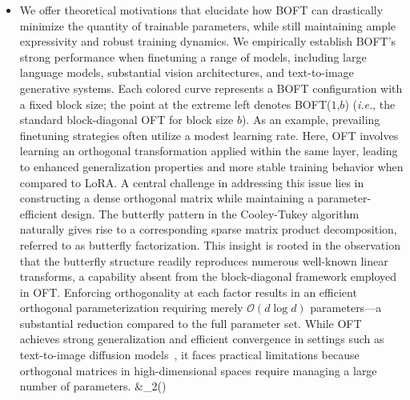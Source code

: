\begin{itemize}[leftmargin=*,nosep]
($m$); for example, BOFT($6$,$4$) requires far fewer parameters but yields an approximation error comparable to BOFT($2$,$16$). To preserve the orthogonality constraint on $\bm{R}$ during fine-tuning, we adopt Cayley parameterization, following~\cite{qiu2023controlling,liu2021orthogonal}: $\bm{R}=(\bm{I}+\bm{Q})(\bm{I}-\bm{Q})^{-1}$, where $\bm{Q}$ is a skew-symmetric matrix such that $\bm{Q}=-\bm{Q}^\top$. We contend that the inductive bias emerging from the butterfly factorization is advantageous for generalization, as it echoes the structured patterns found in well-known linear operators~\cite{dao2019kaleidoscope}, such as the discrete Fourier, sine/cosine, and Hadamard transforms. In contrast, BOFT introduces a novel finetuning approach, employing transformations of the weights using weight matrices shared across layers. \textbf{Inductive bias and generalization in BOFT}. Our method leverages the observation that computational time can be increased to save on storage, as the orthogonal matrix is encoded through successive multiplication of sparse factors, requiring repeated computations during training. To illustrate, each $\bm{B}_i$ must be full-rank to meet the orthogonality requirement, necessitating $d$ connections that create a bijection between the nodes at the $i$-th and $(i=1)$-th levels. This structural constraint instills an inductive bias. \item We offer theoretical motivations that elucidate how BOFT can drastically minimize the quantity of trainable parameters, while still maintaining ample expressivity and robust training dynamics. We empirically establish BOFT's strong performance when finetuning a range of models, including large language models, substantial vision architectures, and text-to-image generative systems. Each colored curve represents a BOFT configuration with a fixed block size; the point at the extreme left denotes BOFT($1$,$b$) (\emph{i.e.}, the standard block-diagonal OFT for block size $b$). As an example, prevailing finetuning strategies often utilize a modest learning rate. Here, OFT involves learning an orthogonal transformation applied within the same layer, leading to enhanced generalization properties and more stable training behavior when compared to LoRA. A central challenge in addressing this issue lies in constructing a dense orthogonal matrix while maintaining a parameter-efficient design. The butterfly pattern in the Cooley-Tukey algorithm naturally gives rise to a corresponding sparse matrix product decomposition, referred to as butterfly factorization. This insight is rooted in the observation that the butterfly structure readily reproduces numerous well-known linear transforms, a capability absent from the block-diagonal framework employed in OFT. Enforcing orthogonality at each factor results in an efficient orthogonal parameterization requiring merely $\mathcal{O}(d\log d)$ parameters—a substantial reduction compared to the full parameter set. While OFT achieves strong generalization and efficient convergence in settings such as text-to-image diffusion models~\cite{qiu2023controlling}, it faces practical limitations because orthogonal matrices in high-dimensional spaces require managing a large number of parameters. &_2()

\end{itemize}
